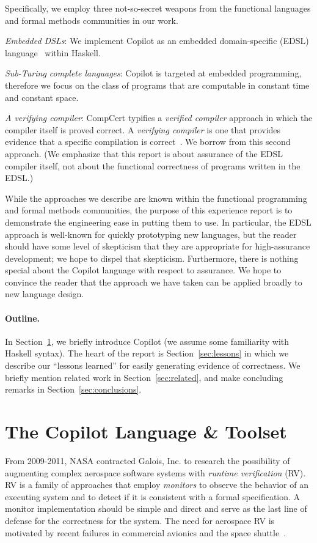\documentclass[preprint]{sigplanconf}
\begin{document}
Specifically, we employ three not-so-secret weapons from the functional languages
and formal methods communities in our work.
\begin{compactenum}
\item {\em Embedded DSLs}: We implement Copilot as an embedded domain-specific
  (EDSL) language~\cite{meijer} within Haskell.
\item {\em Sub-Turing complete languages}: Copilot is targeted at embedded
  programming, therefore we focus on the class of programs that are computable
  in constant time and constant space.
\item {\em A verifying compiler}: CompCert typifies a \emph{verified compiler}
  approach in which the compiler itself is proved correct.  A \emph{verifying
    compiler} is one that provides evidence that a specific compilation is
  correct~\cite{mcrypt}.  We borrow from this second approach.  (We emphasize
  that this report is about assurance of the EDSL compiler itself, not about the
  functional correctness of programs written in the EDSL.)
\end{compactenum}

\noindent
While the approaches we describe are known within the functional programming and
formal methods communities, the purpose of this experience report is to
demonstrate the engineering ease in putting them to use.  In particular, the
EDSL approach is well-known for quickly prototyping new languages, but the reader
should have some level of skepticism that they are appropriate for
high-assurance development; we hope to dispel that skepticism.  Furthermore,
there is nothing special about the Copilot language with respect to assurance.
We hope to convince the reader that the approach we have taken can be applied
broadly to new language design.

\paragraph{Outline.}
In Section~\ref{sec:copilot}, we briefly introduce Copilot (we assume some
familiarity with Haskell syntax).  The heart of the report is
Section~\ref{sec:lessons} in which we describe our ``lessons learned'' for
easily generating evidence of correctness.  We briefly mention related work in
Section~\ref{sec:related}, and make concluding remarks in
Section~\ref{sec:conclusions}.


\section{The Copilot Language \& Toolset}\label{sec:copilot}
From 2009-2011, NASA contracted Galois, Inc. to research the possibility of
augmenting complex aerospace software systems with \emph{runtime verification}
(RV).  RV is a family of approaches that employ \emph{monitors} to observe the
behavior of an executing system and to detect if it is consistent with a formal
specification.  A monitor implementation should be simple and direct and serve
as the last line of defense for the correctness for the system.  The need for
aerospace RV is motivated by recent failures in commercial avionics and the
space shuttle~\cite{monitors}.
\end{document}
